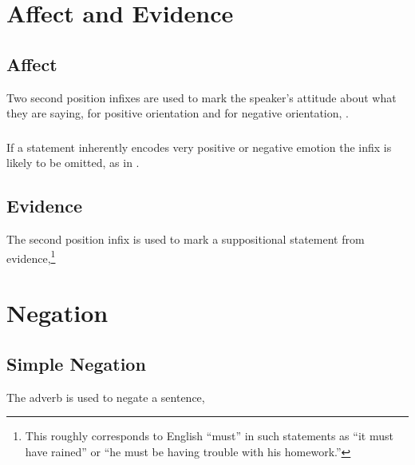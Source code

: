 \section{Affect and Evidence}

\subsection{Affect} Two second position infixes are used to mark the
speaker's attitude about what they are saying,  for
positive orientation and  for negative orientation,
   .

\subsubsection{} If a statement inherently encodes very positive or
negative emotion the infix is likely to be omitted, as in  .

\subsection{Evidence} The second position infix  is used
to mark a suppositional statement from evidence,\footnote{This roughly
corresponds to English ``must'' in such statements as ``it must have
rained'' or ``he must be having trouble with his homework.''}



\section{Negation}

\subsection{Simple Negation} The adverb  is used to negate a
sentence,  

